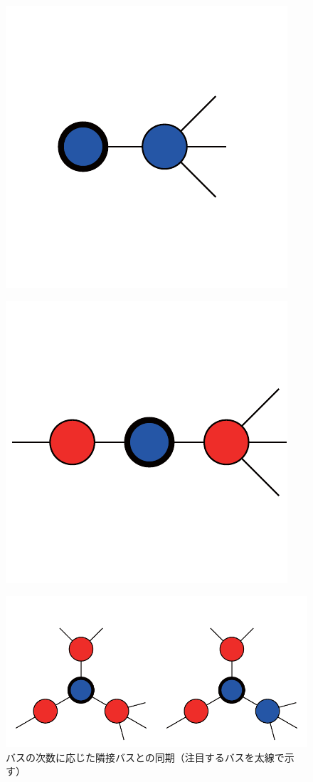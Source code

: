 \documentclass[tombow,dvipdfmx]{corona-a5-1.1}
\begin{document}
\begin{figure}[t]
  \centering
  {
  \begin{minipage}{0.3\linewidth}
    \centering
    \includegraphics[width = .60\linewidth]{figs/1degbus}
    \label{fig:N1} 
  \end{minipage}
  \begin{minipage}{0.3\linewidth}
    \centering
    \includegraphics[width = .60\linewidth]{figs/2degbus}
  \end{minipage}
  \label{fig:N2}
  \begin{minipage}{0.3\linewidth}
    \centering
    \includegraphics[width = .60\linewidth]{figs/3degbus}
  \end{minipage}
  \caption{バスの次数に応じた隣接バスとの同期（注目するバスを太線で示す）}
  \label{fig:bussync}
  }
\end{figure}
\end{document}

